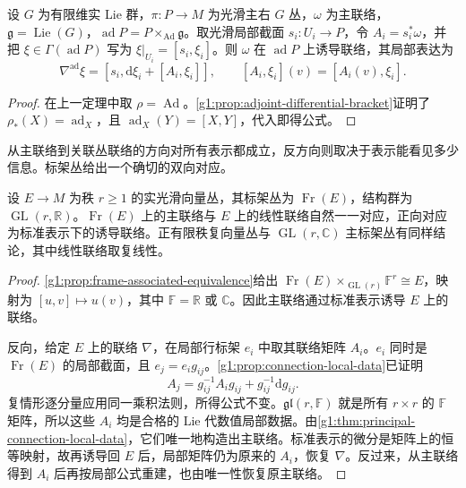 \begin{corollary}\label{g1:cor:adjoint-connection-local}
	设 \(G\) 为有限维实 Lie 群，\(\pi:P\to M\) 为光滑主右 \(G\) 丛，\(\omega\) 为主联络，\(\mathfrak g=\operatorname{Lie}(G)\)，\(\operatorname{ad}P=P\times_{\operatorname{Ad}}\mathfrak g\)。取光滑局部截面 \(s_i:U_i\to P\)，令 \(A_i=s_i^*\omega\)，并把 \(\xi\in\Gamma(\operatorname{ad}P)\) 写为 \(\xi|_{U_i}=[s_i,\xi_i]\)。则 \(\omega\) 在 \(\operatorname{ad}P\) 上诱导联络，其局部表达为
	\[
		\nabla^{\operatorname{ad}}\xi=[s_i,\mathrm{d}\xi_i+[A_i,\xi_i]],
		\qquad [A_i,\xi_i](v)=[A_i(v),\xi_i].
	\]
\end{corollary}
\begin{proof}
	在上一定理中取 \(\rho=\operatorname{Ad}\)。\cref{g1:prop:adjoint-differential-bracket}证明了 \(\rho_*(X)=\operatorname{ad}_X\)，且 \(\operatorname{ad}_X(Y)=[X,Y]\)，代入即得公式。
\end{proof}

从主联络到关联丛联络的方向对所有表示都成立，反方向则取决于表示能看见多少信息。标架丛给出一个确切的双向对应。

\begin{proposition}\label{g1:prop:frame-connection-equivalence}
	设 \(E\to M\) 为秩 \(r\geq1\) 的实光滑向量丛，其标架丛为 \(\operatorname{Fr}(E)\)，结构群为 \(\operatorname{GL}(r,\mathbb R)\)。\(\operatorname{Fr}(E)\) 上的主联络与 \(E\) 上的线性联络自然一一对应，正向对应为标准表示下的诱导联络。正有限秩复向量丛与 \(\operatorname{GL}(r,\mathbb C)\) 主标架丛有同样结论，其中线性联络取复线性。
\end{proposition}
\begin{proof}
	\cref{g1:prop:frame-associated-equivalence}给出 \(\operatorname{Fr}(E)\times_{\operatorname{GL}(r)}\mathbb F^r\cong E\)，映射为 \([u,v]\mapsto u(v)\)，其中 \(\mathbb F=\mathbb R\) 或 \(\mathbb C\)。因此主联络通过标准表示诱导 \(E\) 上的联络。

	反向，给定 \(E\) 上的联络 \(\nabla\)，在局部行标架 \(e_i\) 中取其联络矩阵 \(A_i\)。\(e_i\) 同时是 \(\operatorname{Fr}(E)\) 的局部截面，且 \(e_j=e_i g_{ij}\)。\cref{g1:prop:connection-local-data}已证明
	\[
		A_j=g_{ij}^{-1}A_i g_{ij}+g_{ij}^{-1}\mathrm{d}g_{ij}.
	\]
	复情形逐分量应用同一乘积法则，所得公式不变。\(\mathfrak{gl}(r,\mathbb F)\) 就是所有 \(r\times r\) 的 \(\mathbb F\) 矩阵，所以这些 \(A_i\) 均是合格的 Lie 代数值局部数据。由\cref{g1:thm:principal-connection-local-data}，它们唯一地构造出主联络。标准表示的微分是矩阵上的恒等映射，故再诱导回 \(E\) 后，局部矩阵仍为原来的 \(A_i\)，恢复 \(\nabla\)。反过来，从主联络得到 \(A_i\) 后再按局部公式重建，也由唯一性恢复原主联络。
\end{proof}

